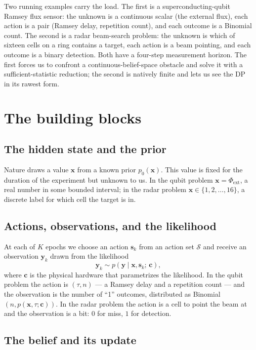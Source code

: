 \documentclass[11pt]{article}
\newcommand{\bc}{\bm{c}}
\newcommand{\bx}{\bm{x}}
\newcommand{\by}{\bm{y}}
\newcommand{\bs}{\bm{s}}
\begin{document}
Two running examples carry the load.  The first is a superconducting-qubit Ramsey flux sensor: the unknown is a continuous scalar (the external flux), each action is a pair (Ramsey delay, repetition count), and each outcome is a Binomial count.  The second is a radar beam-search problem: the unknown is which of sixteen cells on a ring contains a target, each action is a beam pointing, and each outcome is a binary detection.  Both have a four-step measurement horizon.  The first forces us to confront a continuous-belief-space obstacle and solve it with a sufficient-statistic reduction; the second is natively finite and lets us see the DP in its rawest form.

\section{The building blocks}
\label{sec:blocks}

\subsection{The hidden state and the prior}

Nature draws a value $\bx$ from a known prior $p_0(\bx)$.  This value is fixed for the duration of the experiment but unknown to us.  In the qubit problem $\bx = \Phi_\mathrm{ext}$, a real number in some bounded interval; in the radar problem $\bx \in \{1, 2, \ldots, 16\}$, a discrete label for which cell the target is in.

\subsection{Actions, observations, and the likelihood}

At each of $K$ epochs we choose an action $\bs_k$ from an action set $\mathcal{S}$ and receive an observation $\by_k$ drawn from the likelihood
\begin{equation}
\by_k \sim p(\by \mid \bx, \bs_k;\, \bc),
\label{eq:likelihood}
\end{equation}
where $\bc$ is the physical hardware that parametrizes the likelihood.  In the qubit problem the action is $(\tau, n)$ --- a Ramsey delay and a repetition count --- and the observation is the number of ``1'' outcomes, distributed as Binomial$(n, p(\bx, \tau; \bc))$.  In the radar problem the action is a cell to point the beam at and the observation is a bit: $0$ for miss, $1$ for detection.

\subsection{The belief and its update}
\end{document}

